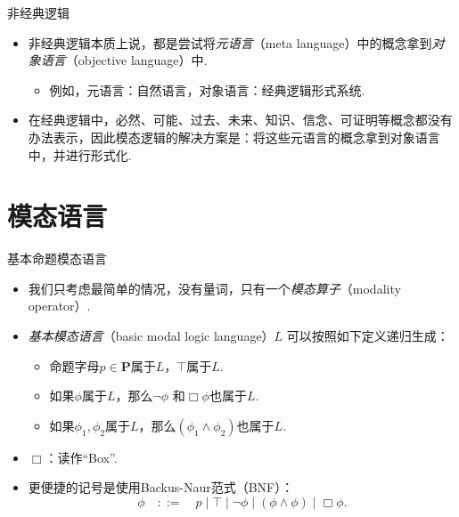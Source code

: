     
    {非经典逻辑}
    \begin{itemize}
        \item 非经典逻辑本质上说，都是尝试将\emph{元语言}（meta language）中的概念拿到\emph{对象语言}（objective language）中.
        \begin{itemize}
        \item 例如，元语言：自然语言，对象语言：经典逻辑形式系统.
        \end{itemize}
        \item 在经典逻辑中，必然、可能、过去、未来、知识、信念、可证明等概念都没有办法表示，因此模态逻辑的解决方案是：将这些元语言的概念拿到对象语言中，并进行形式化.
    \end{itemize}
    
    
    \section{模态语言}
    
    {基本命题模态语言}
    \begin{itemize}
        \item 我们只考虑最简单的情况，没有量词，只有一个\emph{模态算子}（modality operator）.
        \item \emph{基本模态语言}（basic modal logic language）$L$ 可以按照如下定义递归生成：
        \begin{itemize}
            \item 命题字母$p\in \mathbf P$属于$L$，$\top$属于$L$.
            \item 如果$\phi$属于$L$，那么$\neg\phi$ 和$\Box\phi$也属于$L$.
            \item 如果$\phi_1,\phi_2$属于$L$，那么$(\phi_1\wedge\phi_2)$也属于$L$.
        \end{itemize}
        \item $\Box$：读作“Box”.
        \item 更便捷的记号是使用Backus-Naur范式（BNF）：
        \[\phi\quad::=\quad p\mid \top\mid \neg\phi\mid (\phi\wedge\phi)\mid \Box\phi.\] 
    \end{itemize}
    
